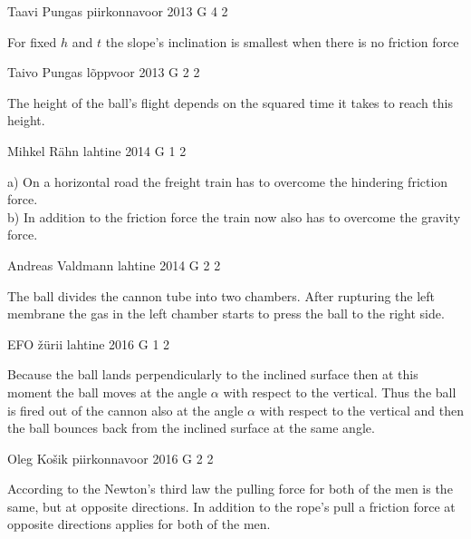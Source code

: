 \documentclass[11pt]{article}
\begin{document}
{Taavi Pungas} %
{piirkonnavoor} %
{2013} %
{G 4} %
{2} %
{

\ifEngHint
For fixed $h$ and $t$ the slope’s inclination is smallest when there is no friction force
\fi
}

{Taivo Pungas} %
{lõppvoor} %
{2013} %
{G 2} %
{2} %
{

\ifEngHint
The height of the ball’s flight depends on the squared time it takes to reach this height.
\fi
}

{Mihkel Rähn} %
{lahtine} %
{2014} %
{G 1} %
{2} %
{

\ifEngHint
a) On a horizontal road the freight train has to overcome the hindering friction force.\\
b) In addition to the friction force the train now also has to overcome the gravity force.
\fi
}

{Andreas Valdmann} %
{lahtine} %
{2014} %
{G 2} %
{2} %
{

\ifEngHint
The ball divides the cannon tube into two chambers. After rupturing the left membrane the gas in the left chamber starts to press the ball to the right side.
\fi
}

{EFO žürii} %
{lahtine} %
{2016} %
{G 1} %
{2} %
{

\ifEngHint
Because the ball lands perpendicularly to the inclined surface then at this moment the ball moves at the angle $\alpha$ with respect to the vertical. Thus the ball is fired out of the cannon also at the angle $\alpha$ with respect to the vertical and then the ball bounces back from the inclined surface at the same angle.
\fi
}

{Oleg Košik} %
{piirkonnavoor} %
{2016} %
{G 2} %
{2} %
{

\ifEngHint
According to the Newton’s third law the pulling force for both of the men is the same, but at opposite directions. In addition to the rope’s pull a friction force at opposite directions applies for both of the men.
\fi
}
\end{document}
